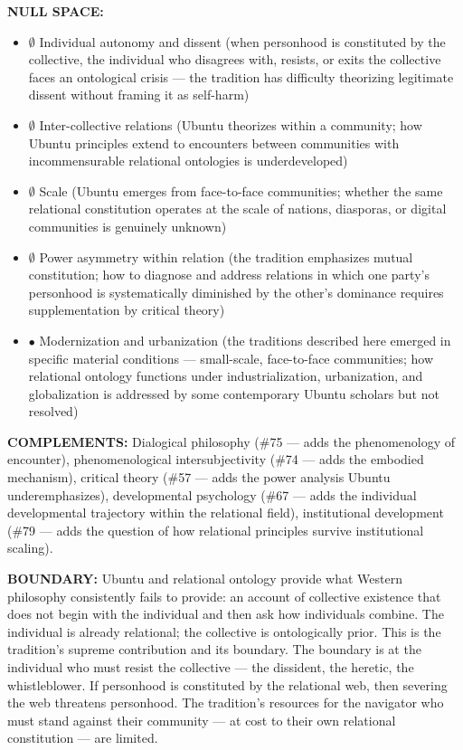 \textbf{NULL SPACE:}

\begin{itemize}[nosep,leftmargin=*]
  \item $\emptyset$ Individual autonomy and dissent (when personhood is constituted by the collective, the individual who disagrees with, resists, or exits the collective faces an ontological crisis — the tradition has difficulty theorizing legitimate dissent without framing it as self-harm)
  \item $\emptyset$ Inter-collective relations (Ubuntu theorizes within a community; how Ubuntu principles extend to encounters between communities with incommensurable relational ontologies is underdeveloped)
  \item $\emptyset$ Scale (Ubuntu emerges from face-to-face communities; whether the same relational constitution operates at the scale of nations, diasporas, or digital communities is genuinely unknown)
  \item $\emptyset$ Power asymmetry within relation (the tradition emphasizes mutual constitution; how to diagnose and address relations in which one party's personhood is systematically diminished by the other's dominance requires supplementation by critical theory)
  \item $\bullet$ Modernization and urbanization (the traditions described here emerged in specific material conditions — small-scale, face-to-face communities; how relational ontology functions under industrialization, urbanization, and globalization is addressed by some contemporary Ubuntu scholars but not resolved)
\end{itemize}


\textbf{COMPLEMENTS:} Dialogical philosophy (\#75 — adds the phenomenology of encounter), phenomenological intersubjectivity (\#74 — adds the embodied mechanism), critical theory (\#57 — adds the power analysis Ubuntu underemphasizes), developmental psychology (\#67 — adds the individual developmental trajectory within the relational field), institutional development (\#79 — adds the question of how relational principles survive institutional scaling).


\textbf{BOUNDARY:} Ubuntu and relational ontology provide what Western philosophy consistently fails to provide: an account of collective existence that does not begin with the individual and then ask how individuals combine. The individual is already relational; the collective is ontologically prior. This is the tradition's supreme contribution and its boundary. The boundary is at the individual who must resist the collective — the dissident, the heretic, the whistleblower. If personhood is constituted by the relational web, then severing the web threatens personhood. The tradition's resources for the navigator who must stand against their community — at cost to their own relational constitution — are limited.


